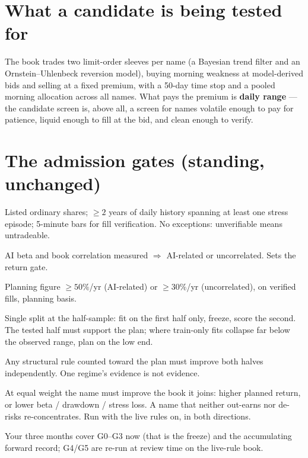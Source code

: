 \documentclass[11pt,a4paper]{article}
\begin{document}
\section{What a candidate is being tested for}

The book trades two limit-order sleeves per name (a Bayesian trend filter and
an Ornstein--Uhlenbeck reversion model), buying morning weakness at
model-derived bids and selling at a fixed premium, with a 50-day time stop and
a pooled morning allocation across all names. What pays the premium is
\textbf{daily range} --- the candidate screen is, above all, a screen for
names volatile enough to pay for patience, liquid enough to fill at the bid,
and clean enough to verify.

\section{The admission gates (standing, unchanged)}

\begin{description}[leftmargin=1.9em, itemsep=3pt]
\item[G0 --- Data \& instrument.] Listed ordinary shares; $\geq 2$ years of
daily history spanning at least one stress episode; 5-minute bars for fill
verification. No exceptions: unverifiable means untradeable.
\item[G1 --- Classification.] AI beta and book correlation measured
$\Rightarrow$ AI-related or uncorrelated. Sets the return gate.
\item[G2 --- Return gate.] Planning figure $\geq 50\%$/yr (AI-related) or
$\geq 30\%$/yr (uncorrelated), on verified fills, planning basis.
\item[G3 --- Transportability.] Single split at the half-sample: fit on the
first half only, freeze, score the second. The tested half must support the
plan; where train-only fits collapse far below the observed range, plan on the
low end.
\item[G4 --- Both-halves rule.] Any structural rule counted toward the plan
must improve both halves independently. One regime's evidence is not evidence.
\item[G5 --- Marginal book test.] At equal weight the name must improve the
book it joins: higher planned return, or lower beta / drawdown / stress loss.
A name that neither out-earns nor de-risks re-concentrates. Run with the live
rules on, in both directions.
\end{description}

Your three months cover G0--G3 now (that is the freeze) and the accumulating
forward record; G4/G5 are re-run at review time on the live-rule book.
\end{document}
